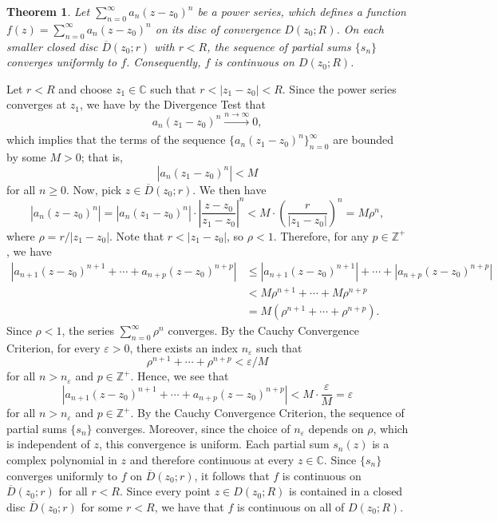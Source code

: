 \documentclass[10pt]{article}
\makeatletter
\newcommand{\eps}{\varepsilon}
\newcommand{\C}{\mathbb{C}}
\newcommand{\Z}{\mathbb{Z}}
\theoremstyle{newstyle}
\newtheorem{thm}{Theorem}[section]
\newenvironment{pf}[1][\proofname]{\par
  \pushQED{\qed}%
  \normalfont \topsep0\p@\relax
  \trivlist
  \item[\hskip\labelsep\scshape
  #1\@addpunct{.}]\ignorespaces
}{%
  \popQED\endtrivlist\@endpefalse
}
\makeatother
\begin{document}
\begin{thm}
Let $\sum_{n=0}^\infty a_n(z-z_0)^n$ be a power series, which defines a function 
$f(z) = \sum_{n=0}^\infty a_n(z-z_0)^n$ on its disc of convergence $D(z_0; R)$. On each 
smaller closed disc $\overline{D}(z_0; r)$ with $r < R$, the sequence of partial sums 
$\{s_n\}$ converges uniformly to $f$. Consequently, $f$ is continuous on $D(z_0; R)$. 
\end{thm}
\begin{pf}
Let $r < R$ and choose $z_1 \in \C$ such that $r < |z_1 - z_0| < R$. Since the power series 
converges at $z_1$, we have by the Divergence Test that 
\[ a_n(z_1-z_0)^n \xrightarrow[]{n\to\infty} 0, \]
which implies that the terms of the sequence $\{a_n(z_1-z_0)^n\}_{n=0}^\infty$ are bounded 
by some $M > 0$; that is, 
\[ |a_n(z_1-z_0)^n| < M \]
for all $n \geq 0$. Now, pick $z \in \overline{D}(z_0; r)$. We then have 
\[ |a_n(z - z_0)^n| = |a_n(z_1-z_0)^n| \cdot \left| \frac{z-z_0}{z_1-z_0} \right|^n < 
M \cdot \left( \frac{r}{|z_1-z_0|} \right)^n = M\rho^n, \]
where $\rho = r/|z_1-z_0|$. Note that $r < |z_1-z_0|$, so $\rho < 1$. 
Therefore, for any $p \in \Z^+$, we have 
\begin{align*}
    |a_{n+1}(z-z_0)^{n+1} + \cdots + a_{n+p}(z-z_0)^{n+p}| 
    &\leq |a_{n+1}(z-z_0)^{n+1}| + \cdots + |a_{n+p}(z-z_0)^{n+p}| \\
    &< M\rho^{n+1} + \cdots + M\rho^{n+p} \\
    &= M(\rho^{n+1} + \cdots + \rho^{n+p}).
\end{align*}
Since $\rho < 1$, the series $\sum_{n=0}^\infty \rho^n$ converges. By the Cauchy Convergence 
Criterion, for every $\eps > 0$, there exists an index $n_{\eps}$ such that 
\[ \rho^{n+1} + \cdots + \rho^{n+p} < \eps/M \]
for all $n > n_{\eps}$ and $p \in \Z^+$. Hence, we see that 
\[ |a_{n+1}(z-z_0)^{n+1} + \cdots + a_{n+p}(z-z_0)^{n+p}| < M \cdot \frac{\eps}M = \eps \]
for all $n > n_{\eps}$ and $p \in \Z^+$. By the Cauchy Convergence Criterion, the sequence of 
partial sums $\{s_n\}$ converges. Moreover, since the choice of $n_{\eps}$ depends on 
$\rho$, which is independent of $z$, this convergence is uniform. Each partial sum 
$s_n(z)$ is a complex polynomial in $z$ and therefore continuous at every $z \in \C$. 
Since $\{s_n\}$ converges uniformly to $f$ on $\overline{D}(z_0; r)$, it follows that 
$f$ is continuous on $\overline{D}(z_0; r)$ for all $r < R$. Since every point 
$z \in D(z_0; R)$ is contained in a closed disc $\overline{D}(z_0; r)$ for some $r < R$, we have that 
$f$ is continuous on all of $D(z_0; R)$. 
\end{pf}
\end{document}

